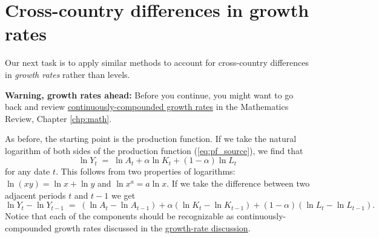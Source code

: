 %


\section{Cross-country differences in growth rates}

Our next task is to apply similar methods to account for cross-country differences in \emph{growth rates} rather than levels.

\textbf{Warning, growth rates ahead:} Before you continue, you might want to go back and review
\hyperref[sec:growth_math_cc]{continuously-compounded growth rates}
in the Mathematics Review, Chapter \ref{chp:math}.

As before, the starting point is the production function.
If we take the natural logarithm of both sides of the production function (\ref{eq:pf_source}),
we find that
\[
    \ln Y_t \;=\;  \ln A_t + \alpha \ln K_t
            + (1-\alpha) \ln L_t
\]
for any date $t$.
This follows from two properties of logarithms:  $ \ln (xy) = \ln x + \ln y$
and $\ln x^a = a \ln x$.
If we take the difference between two adjacent periods $t$ and $t-1$ we get
\[
    \ln Y_t -  \ln Y_{t-1} \;=\;  (\ln A_t - \ln A_{t-1}) + \alpha (\ln K_t-\ln K_{t-1})
            + (1-\alpha) (\ln L_t - \ln L_{t-1}).
\]
Notice that each of the components should be recognizable as continuously-compounded growth rates discussed in the \hyperref[sec:growth_math_cc]{growth-rate discussion}.

